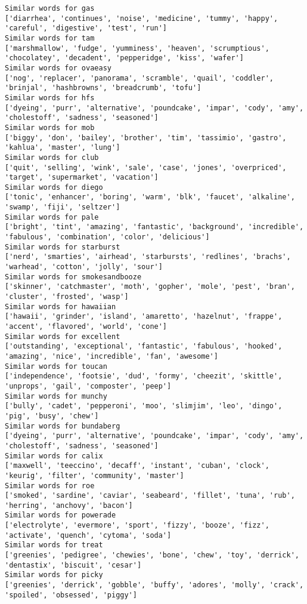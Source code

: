 \documentclass[11pt]{article}
\begin{document}
\begin{Verbatim}[commandchars=\\\{\}]
Similar words for gas
['diarrhea', 'continues', 'noise', 'medicine', 'tummy', 'happy', 'careful', 'digestive', 'test', 'run']
Similar words for tam
['marshmallow', 'fudge', 'yumminess', 'heaven', 'scrumptious', 'chocolatey', 'decadent', 'pepperidge', 'kiss', 'wafer']
Similar words for ovaeasy
['nog', 'replacer', 'panorama', 'scramble', 'quail', 'coddler', 'brinjal', 'hashbrowns', 'breadcrumb', 'tofu']
Similar words for hfs
['dyeing', 'purr', 'alternative', 'poundcake', 'impar', 'cody', 'amy', 'cholestoff', 'sadness', 'seasoned']
Similar words for mob
['biggy', 'don', 'bailey', 'brother', 'tim', 'tassimio', 'gastro', 'kahlua', 'master', 'lung']
Similar words for club
['quit', 'selling', 'wink', 'sale', 'case', 'jones', 'overpriced', 'target', 'supermarket', 'vacation']
Similar words for diego
['tonic', 'enhancer', 'boring', 'warm', 'blk', 'faucet', 'alkaline', 'swamp', 'fiji', 'seltzer']
Similar words for pale
['bright', 'tint', 'amazing', 'fantastic', 'background', 'incredible', 'fabulous', 'combination', 'color', 'delicious']
Similar words for starburst
['nerd', 'smarties', 'airhead', 'starbursts', 'redlines', 'brachs', 'warhead', 'cotton', 'jolly', 'sour']
Similar words for smokesandbooze
['skinner', 'catchmaster', 'moth', 'gopher', 'mole', 'pest', 'bran', 'cluster', 'frosted', 'wasp']
Similar words for hawaiian
['hawaii', 'grinder', 'island', 'amaretto', 'hazelnut', 'frappe', 'accent', 'flavored', 'world', 'cone']
Similar words for excellent
['outstanding', 'exceptional', 'fantastic', 'fabulous', 'hooked', 'amazing', 'nice', 'incredible', 'fan', 'awesome']
Similar words for toucan
['independence', 'footsie', 'dud', 'formy', 'cheezit', 'skittle', 'unprops', 'gail', 'composter', 'peep']
Similar words for munchy
['bully', 'cadet', 'pepperoni', 'moo', 'slimjim', 'leo', 'dingo', 'pig', 'busy', 'chew']
Similar words for bundaberg
['dyeing', 'purr', 'alternative', 'poundcake', 'impar', 'cody', 'amy', 'cholestoff', 'sadness', 'seasoned']
Similar words for calix
['maxwell', 'teeccino', 'decaff', 'instant', 'cuban', 'clock', 'keurig', 'filter', 'community', 'master']
Similar words for roe
['smoked', 'sardine', 'caviar', 'seabeard', 'fillet', 'tuna', 'rub', 'herring', 'anchovy', 'bacon']
Similar words for powerade
['electrolyte', 'evermore', 'sport', 'fizzy', 'booze', 'fizz', 'activate', 'quench', 'cytoma', 'soda']
Similar words for treat
['greenies', 'pedigree', 'chewies', 'bone', 'chew', 'toy', 'derrick', 'dentastix', 'biscuit', 'cesar']
Similar words for picky
['greenies', 'derrick', 'gobble', 'buffy', 'adores', 'molly', 'crack', 'spoiled', 'obsessed', 'piggy']

\end{Verbatim}
\end{document}
